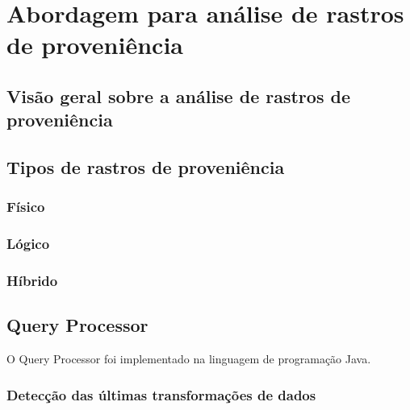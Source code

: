 
\chapter{Abordagem para análise de rastros de proveniência}%
\label{chap:rastros-de-proveniencia}


\section{Visão geral sobre a análise de rastros de proveniência}

 
\section{Tipos de rastros de proveniência}


\subsection{Físico}

\subsection{Lógico}

\subsection{Híbrido}


\section{Query Processor}


O Query Processor foi implementado na linguagem de programação Java.

\subsection{Detecção das últimas transformações de dados}

